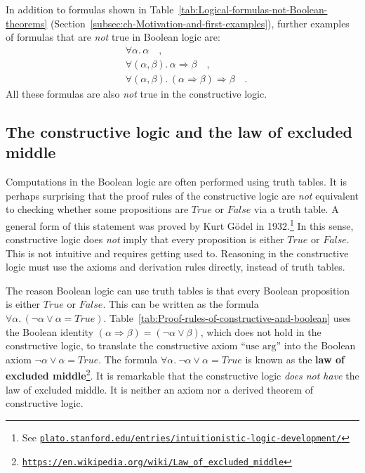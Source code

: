 In addition to formulas shown in Table~\ref{tab:Logical-formulas-not-Boolean-theorems}
(Section~\ref{subsec:ch-Motivation-and-first-examples}), further
examples of formulas that are \emph{not} true in Boolean logic are:
\begin{align*}
 & \forall\alpha.\,\alpha\quad,\\
 & \forall(\alpha,\beta).\,\alpha\Rightarrow\beta\quad,\\
 & \forall(\alpha,\beta).\,(\alpha\Rightarrow\beta)\Rightarrow\beta\quad.
\end{align*}
All these formulas are also \emph{not} true in the constructive logic.

\subsection{The constructive logic and the law of excluded middle}

Computations in the Boolean logic are often performed using truth
tables. It is perhaps surprising that the proof rules of the constructive
logic are \emph{not} equivalent to checking whether some propositions
are $True$ or $False$ via a truth table. A general form of this
statement was proved by Kurt G\"odel in
1932.\footnote{See \texttt{\href{https://plato.stanford.edu/entries/intuitionistic-logic-development/\#SomeEarlResu}{plato.stanford.edu/entries/intuitionistic-logic-development/}}}
In this sense, constructive logic does \emph{not} imply that every
proposition is either $True$ or $False$. This is not intuitive and
requires getting used to. Reasoning in the constructive logic must
use the axioms and derivation rules directly, instead of truth tables.

The reason Boolean logic can use truth tables is that every Boolean
proposition is either $True$ or $False$. This can be written as
the formula $\forall\alpha.\,(\neg\alpha\vee\alpha=True)$. Table~\ref{tab:Proof-rules-of-constructive-and-boolean}
uses the Boolean identity $\left(\alpha\Rightarrow\beta\right)=(\neg\alpha\vee\beta)$,
which does not hold in the constructive logic, to translate the constructive
axiom \textsf{``}$\text{use arg}$\textsf{''} into the Boolean axiom $\neg\alpha\vee\alpha=True$.
The formula $\forall\alpha.\:\neg\alpha\vee\alpha=True$ is known
as the \textbf{law of excluded middle}\footnote{\texttt{\href{https://en.wikipedia.org/wiki/Law_of_excluded_middle}{https://en.wikipedia.org/wiki/Law\_of\_excluded\_middle}}}.
It is remarkable that the constructive logic \emph{does not have}
the law of excluded middle. It is neither an axiom nor a derived theorem
of constructive logic.

